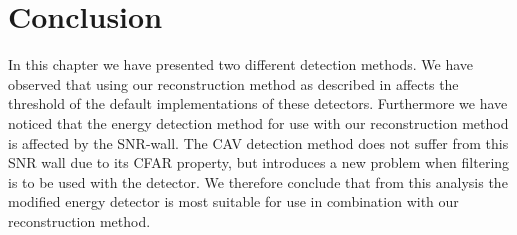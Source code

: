 \documentclass[a4paper, openany, oneside]{memoir}
\begin{document}
\section{Conclusion}
In this chapter we have presented two different detection methods. We have observed that using our reconstruction method as described in  affects the threshold of the default implementations of these detectors. Furthermore we have noticed that the energy detection method for use with our reconstruction method is affected by the SNR-wall. The CAV detection method does not suffer from this SNR wall due to its CFAR property, but introduces a new problem when filtering is to be used with the detector. We therefore conclude that from this analysis the modified energy detector is most suitable for use in combination with our reconstruction method.
\end{document}
